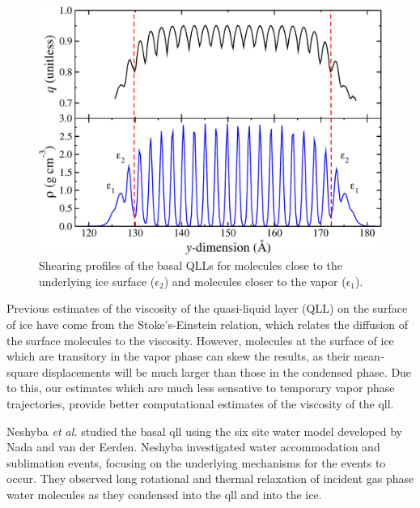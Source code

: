 \begin{figure}
\includegraphics[width=\linewidth]{Figures/prism_rhoq}
\caption{\label{fig:prism_rhoq} Shearing profiles of the basal QLLs for
  molecules close to the underlying ice surface ($\epsilon_{2}$) and
  molecules closer to the vapor ($\epsilon_{1}$). }
\end{figure}                



Previous estimates of the viscosity of the quasi-liquid layer (QLL) on the surface of
ice have come from the Stoke's-Einstein relation, which relates the
diffusion of the surface molecules to the viscosity. However,
molecules at the surface of ice which are transitory in the vapor
phase can skew the results, as their mean-square displacements will be
much larger than those in the condensed phase. Due to this, our
estimates which are much less sensative to temporary vapor phase
trajectories, provide better computational estimates of the viscosity
of the qll.

Neshyba \textit{et al.} studied the basal qll using the six site water
model developed by Nada and van der Eerden. Neshyba investigated water
accommodation and sublimation events, focusing on the underlying
mechanisms for the events to occur. They observed long rotational and
thermal relaxation of incident gas phase water molecules as they
condensed into the qll and into the ice. \cite{Neshyba2009} 



